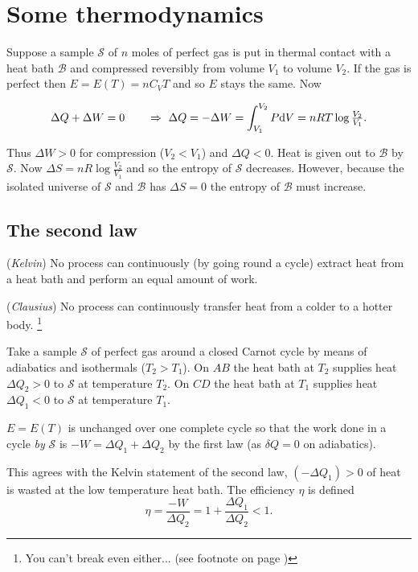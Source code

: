 \documentclass{notes}
\newcommand{\cS}{\mathcal{S}}
\newcommand{\cB}{\mathcal{B}}
\begin{document}
\section{Some thermodynamics}

Suppose a sample $\cS$ of $n$ moles of perfect gas is put in thermal contact
with a heat bath $\cB$ and compressed reversibly from volume $V_1$ to
volume $V_2$.  If the gas is perfect then $E = E(T) = n C_V T$ and
so $E$ stays the same.  Now

\[
\Delta Q + \Delta W = 0 \qquad \Rightarrow\ \Delta Q = -\Delta W
= \int_{V_1}^{V_2}P \mathrm{d} V = n R T \log \tfrac{V_2}{V_1}.
\] 

Thus $\Delta W > 0$ for compression ($V_2 < V_1$) and $\Delta Q < 0$.
Heat is given out to $\cB$ by $\cS$.  Now $\Delta S = n R \log
\tfrac{V_2}{V_1}$ and so the entropy of $\cS$ decreases.  However,
because the isolated universe of $\cS$ and $\cB$ has $\Delta S = 0$
the entropy of $\cB$ must increase.

\subsection{The second law}

(\emph{Kelvin}) No process can continuously (by going round a cycle)
extract heat from a heat bath and perform an equal amount of work.

\noindent (\emph{Clausius}) No process can continuously transfer heat from a
colder to a hotter body.%
\footnote{You can't break even either... (see footnote on page
  \pageref{pg:1law})}


\vspace{1.5in}

Take a sample $\cS$ of perfect gas around a closed Carnot cycle by means
of adiabatics and isothermals ($T_2 > T_1$).  On $AB$ the heat bath
at $T_2$ supplies heat $\Delta Q_2 > 0$ to $\cS$ at temperature $T_2$.
On $CD$ the heat bath at $T_1$ supplies heat $\Delta Q_1 < 0$ to $\cS$
at temperature $T_1$.

$E=E(T)$ is unchanged over one complete cycle so that the work done in
a cycle \emph{by} $\cS$ is $- W = \Delta Q_1 + \Delta Q_2$ by the first
law (as $\delta Q = 0$ on adiabatics).

This agrees with the Kelvin statement of the second law, $(-\Delta Q_1) > 0$
of heat is wasted at the low temperature heat bath.  The efficiency
$\eta$ is defined
\[
\eta = \frac{-W}{\Delta Q_2} = 1 + \frac{\Delta Q_1}{\Delta Q_2} < 1.
\]
\end{document}

